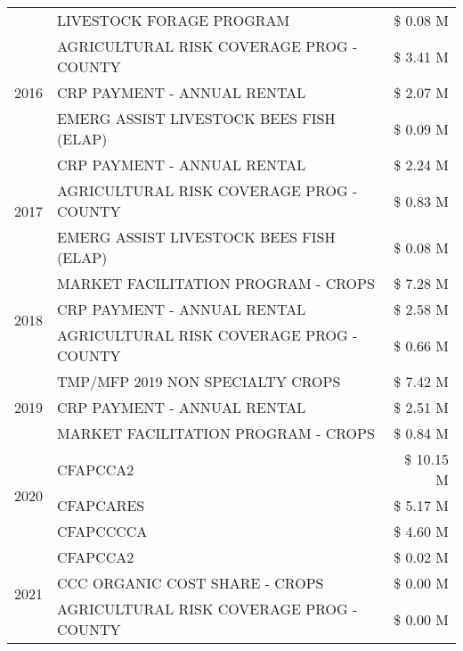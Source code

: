 \begin{tabular}{llr}
 & LIVESTOCK FORAGE PROGRAM & \$ 0.08 M \\
\cline{1-3}
\multirow[t]{3}{*}{2016} & AGRICULTURAL RISK COVERAGE PROG - COUNTY & \$ 3.41 M \\
 & CRP PAYMENT - ANNUAL RENTAL & \$ 2.07 M \\
 & EMERG ASSIST LIVESTOCK BEES FISH (ELAP) & \$ 0.09 M \\
\cline{1-3}
\multirow[t]{3}{*}{2017} & CRP PAYMENT - ANNUAL RENTAL & \$ 2.24 M \\
 & AGRICULTURAL RISK COVERAGE PROG - COUNTY & \$ 0.83 M \\
 & EMERG ASSIST LIVESTOCK BEES FISH (ELAP) & \$ 0.08 M \\
\cline{1-3}
\multirow[t]{3}{*}{2018} & MARKET FACILITATION PROGRAM - CROPS & \$ 7.28 M \\
 & CRP PAYMENT - ANNUAL RENTAL & \$ 2.58 M \\
 & AGRICULTURAL RISK COVERAGE PROG - COUNTY & \$ 0.66 M \\
\cline{1-3}
\multirow[t]{3}{*}{2019} & TMP/MFP 2019 NON SPECIALTY CROPS & \$ 7.42 M \\
 & CRP PAYMENT - ANNUAL RENTAL & \$ 2.51 M \\
 & MARKET FACILITATION PROGRAM - CROPS & \$ 0.84 M \\
\cline{1-3}
\multirow[t]{3}{*}{2020} & CFAPCCA2 & \$ 10.15 M \\
 & CFAPCARES & \$ 5.17 M \\
 & CFAPCCCCA & \$ 4.60 M \\
\cline{1-3}
\multirow[t]{3}{*}{2021} & CFAPCCA2 & \$ 0.02 M \\
 & CCC ORGANIC COST SHARE - CROPS & \$ 0.00 M \\
 & AGRICULTURAL RISK COVERAGE PROG - COUNTY & \$ 0.00 M \\
\cline{1-3}
\bottomrule
\end{tabular}

